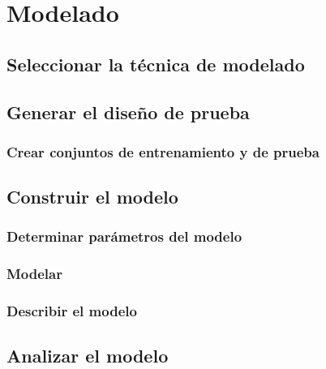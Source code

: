 \documentclass[11pt,a4paper,twoside]{tesis}
\begin{document}
\chapter{Modelado}
\section{Seleccionar la técnica de modelado}
\section{Generar el diseño de prueba}
\subsection{Crear conjuntos de entrenamiento y de prueba}
\section{Construir el modelo}
\subsection{Determinar parámetros del modelo}
\subsection{Modelar}
\subsection{Describir el modelo}
\section{Analizar el modelo}
\end{document}
